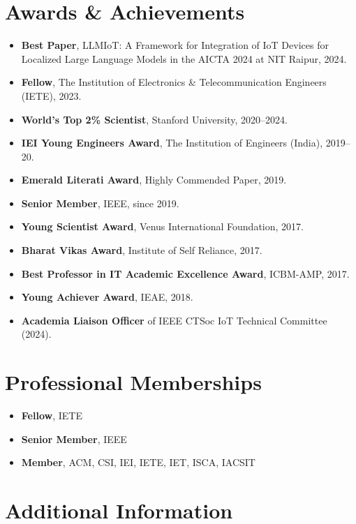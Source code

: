 \documentclass[10pt,a4paper]{article}
\begin{document}
	\section*{Awards \& Achievements}
	
	\begin{itemize}[leftmargin=0.15in]
		\item \textbf{Best Paper}, LLMIoT: A Framework for Integration of IoT Devices for Localized Large Language
		Models in the AICTA 2024 at NIT Raipur, 2024.
		\item \textbf{Fellow}, The Institution of Electronics \& Telecommunication Engineers (IETE), 2023.
		\item \textbf{World's Top 2\% Scientist}, Stanford University, 2020--2024.
		\item \textbf{IEI Young Engineers Award}, The Institution of Engineers (India), 2019--20.
		\item \textbf{Emerald Literati Award}, Highly Commended Paper, 2019.
		\item \textbf{Senior Member}, IEEE, since 2019.
		\item \textbf{Young Scientist Award}, Venus International Foundation, 2017.
		\item \textbf{Bharat Vikas Award}, Institute of Self Reliance, 2017.
		\item \textbf{Best Professor in IT Academic Excellence Award}, ICBM-AMP, 2017.
		\item \textbf{Young Achiever Award}, IEAE, 2018.
		\item \textbf{Academia Liaison Officer} of IEEE CTSoc IoT Technical Committee (2024).
		
		
	\end{itemize}
	
	\section*{Professional Memberships}
	
	\begin{itemize}[leftmargin=0.15in]
		\item \textbf{Fellow}, IETE
		\item \textbf{Senior Member}, IEEE
		\item \textbf{Member}, ACM, CSI, IEI, IETE, IET, ISCA, IACSIT
	\end{itemize}
	
	\section*{Additional Information}
	
\end{document}

